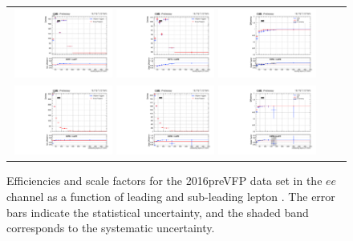 \begin{figure}[h]
  \begin{center}
    \begin{tabular}{ccc}
      \includegraphics[width=0.32\textwidth]{fig_2016preVFP_TrigSF/g_lepApt_ee_MC.pdf}
      \includegraphics[width=0.32\textwidth]{fig_2016preVFP_TrigSF/g_lepApt_ee_data.pdf}
      \includegraphics[width=0.32\textwidth]{fig_2016preVFP_TrigSF/g_ee_lepApt_FullSystUncBand.pdf}\\
      \includegraphics[width=0.32\textwidth]{fig_2016preVFP_TrigSF/g_lepBpt_ee_MC.pdf}
      \includegraphics[width=0.32\textwidth]{fig_2016preVFP_TrigSF/g_lepBpt_ee_data.pdf}
      \includegraphics[width=0.32\textwidth]{fig_2016preVFP_TrigSF/g_ee_lepBpt_FullSystUncBand.pdf}\\
    \end{tabular}
    \caption{Efficiencies and scale factors for the 2016preVFP data set in the $ee$ channel as a function of leading and sub-leading lepton \pT.
            The error bars indicate the statistical uncertainty, and the shaded band corresponds to the systematic uncertainty.
            }
    \label{TrigSF_2016preVFP_2}
  \end{center}
\end{figure}


